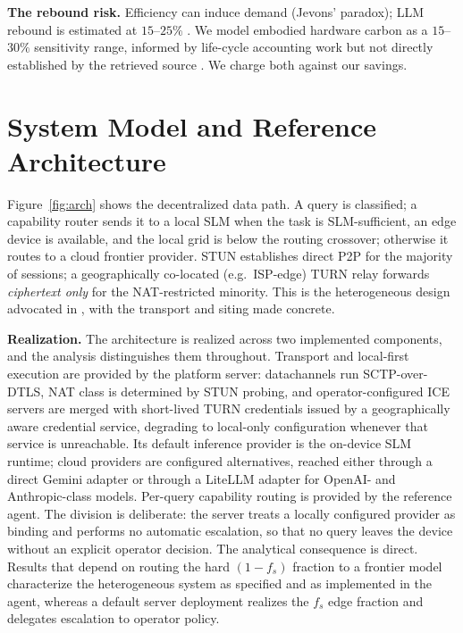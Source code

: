 \documentclass[conference]{IEEEtran}
\newcommand{\fs}{f_{s}}
\begin{document}
\textbf{The rebound risk.}
Efficiency can induce demand (Jevons' paradox); LLM rebound is estimated at
$15$--$25\%$ \cite{luccioni2025}. We model embodied hardware carbon as a
$15$--$30\%$ sensitivity range, informed by life-cycle accounting work but not
directly established by the retrieved source \cite{schneider2025}. We charge
both against our savings.

\section{System Model and Reference Architecture}
\label{sec:architecture}
Figure~\ref{fig:arch} shows the decentralized data path. A query is classified;
a capability router sends it to a local SLM when the task is SLM-sufficient, an
edge device is available, and the local grid is below the routing crossover;
otherwise it routes to a cloud frontier provider. STUN establishes direct P2P for
the majority of sessions; a geographically co-located (e.g.\ ISP-edge) TURN relay
forwards \emph{ciphertext only} for the NAT-restricted minority. This is the
heterogeneous design advocated in \cite{belcak2025}, with the transport and
siting made concrete.

\textbf{Realization.} The architecture is realized across two
implemented components, and the analysis distinguishes them throughout. Transport and
local-first execution are provided by the platform server: datachannels run
SCTP-over-DTLS, NAT class is determined by STUN probing, and
operator-configured ICE servers are merged with short-lived TURN credentials
issued by a geographically aware credential service, degrading to local-only
configuration whenever that service is unreachable. Its default inference
provider is the on-device SLM runtime; cloud providers are configured
alternatives, reached either through a direct Gemini adapter or through a
LiteLLM adapter for OpenAI- and Anthropic-class models. Per-query capability
routing is provided by the reference agent. The division is
deliberate: the server treats a locally configured provider as binding and
performs no automatic escalation, so that no query leaves the device without an
explicit operator decision. The analytical consequence is direct. Results that
depend on routing the hard $(1-\fs)$ fraction to a frontier model characterize
the heterogeneous system as specified and as implemented in the agent, whereas
a default server deployment realizes the $\fs$ edge fraction and delegates
escalation to operator policy.
\end{document}
